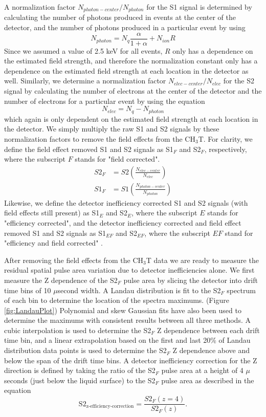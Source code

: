 \documentclass[a4paper,12pt]{article}
\begin{document}
{A normalization factor $N_{photon-center}/N_{photon}$ for the S1 signal is determined by calculating the number of photons produced in events at the center of the detector, and the number of photons produced in a particular event by using
\begin{equation}
N_{photon} = N_q\frac{\alpha}{1+\alpha} + N_{ion}R
\end{equation}
Since we assumed a value of 2.5 keV for all events, $R$ only has a dependence on the estimated field strength, and therefore the normalization constant only has a dependence on the estimated field strength at each location in the detector as well.  Similarly, we determine a normalization factor $N_{elec-center}/N_{elec}$ for the S2 signal by calculating the number of electrons at the center of the detector and the number of electrons for a particular event by using the equation
\begin{equation}
N_{elec}=N_q-N_{photon}
\end{equation}
which again is only dependent on the estimated field strength at each location in the detector.  We simply multiply the raw S1 and S2 signals by these normalization factors to remove the field effects from the CH$_3$T.  For clarity, we define the field effect removed S1 and S2 signals as S1$_F$ and S2$_F$, respectively, where the subscript $F$ stands for "field corrected".   
\begin{align}
S2_F &=S2 \left( \frac{N_{elec-center}}{N_{elec}} \right) \\
S1_F &=S1 \left( \frac{N_{photon-center}}{N_{photon}} \right)
\end{align}
Likewise, we define the detector inefficiency corrected S1 and S2 signals (with field effects still present) as S1$_E$ and S2$_E$, where the subscript $E$ stands for "efficiency corrected", and the detector inefficiency corrected and field effect removed S1 and S2 signals as S1$_{EF}$ and S2$_{EF}$, where the subscript $EF$ stand for "efficiency and field corrected" . 

After removing the field effects from the CH$_3$T data we are ready to measure the residual spatial pulse area variation due to detector inefficiencies alone.  We first measure the Z dependence of the S2$_F$ pulse area by slicing the detector into drift time bins of 10 $\mu$second width.  A Landau distribution is fit to the S2$_F$ spectrum of each bin to determine the location of the spectra maximums. (Figure \ref{fig:LandauPlot})  Polynomial and skew Gaussian fits have also been used to determine the maximums with consistent results between all three methods.  A cubic interpolation is used to determine the S2$_F$ Z dependence between each drift time bin, and a linear extrapolation based on the first and last 20\% of Landau distribution data points is used to determine the S2$_F$ Z dependence above and below the span of the drift time bins.  A detector inefficiency correction for the Z direction is defined by taking the ratio of the S2$_F$ pulse area at a height of 4 $\mu$seconds (just below the liquid surface) to the S2$_F$ pulse area as described in the equation
\begin{equation}
\mbox{S}2_{\mbox{z-efficiency-correction}} = \frac{S2_F(z=4)}{S2_F(z)}.
\end{equation} 


}
\end{document}

